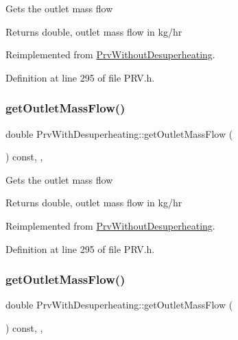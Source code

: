 Gets the outlet mass flow \begin{DoxyReturn}{Returns}
double, outlet mass flow in kg/hr 
\end{DoxyReturn}


Reimplemented from \hyperlink{class_prv_without_desuperheating_aefe4227f2c01209ba4ce79f6b5825d73}{Prv\+Without\+Desuperheating}.



Definition at line 295 of file P\+R\+V.\+h.

\mbox{\label{class_prv_with_desuperheating_a76c03ff2f54c85cd0c80543f23549635}} 
\subsubsection{\texorpdfstring{get\+Outlet\+Mass\+Flow()}{getOutletMassFlow()}\hspace{0.1cm}{\footnotesize\ttfamily [2/3]}}
{\footnotesize\ttfamily double Prv\+With\+Desuperheating\+::get\+Outlet\+Mass\+Flow (\begin{DoxyParamCaption}{ }\end{DoxyParamCaption}) const\hspace{0.3cm}{\ttfamily [inline]}, {\ttfamily [override]}, {\ttfamily [virtual]}}

Gets the outlet mass flow \begin{DoxyReturn}{Returns}
double, outlet mass flow in kg/hr 
\end{DoxyReturn}


Reimplemented from \hyperlink{class_prv_without_desuperheating_aefe4227f2c01209ba4ce79f6b5825d73}{Prv\+Without\+Desuperheating}.



Definition at line 295 of file P\+R\+V.\+h.

\mbox{\label{class_prv_with_desuperheating_a76c03ff2f54c85cd0c80543f23549635}} 
\subsubsection{\texorpdfstring{get\+Outlet\+Mass\+Flow()}{getOutletMassFlow()}\hspace{0.1cm}{\footnotesize\ttfamily [3/3]}}
{\footnotesize\ttfamily double Prv\+With\+Desuperheating\+::get\+Outlet\+Mass\+Flow (\begin{DoxyParamCaption}{ }\end{DoxyParamCaption}) const\hspace{0.3cm}{\ttfamily [inline]}, {\ttfamily [override]}, {\ttfamily [virtual]}}

